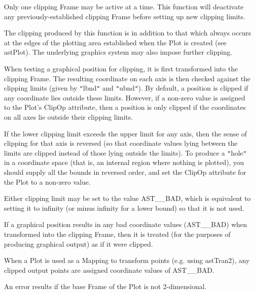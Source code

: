 \documentclass[twoside,11pt]{article}
\newcommand{\htmlref}[2]{#1}
\begin{document}
{{{         \sstitem
         Only one clipping Frame may be active at a time. This function
         will deactivate any previously-established clipping Frame before
         setting up new clipping limits.

         \sstitem
         The clipping produced by this function is in addition to that
         which always occurs at the edges of the plotting area
         established when the Plot is created (see \htmlref{astPlot}{astPlot}). The
         underlying graphics system may also impose further clipping.

         \sstitem
         When testing a graphical position for clipping, it is first
         transformed into the clipping Frame. The resulting coordinate on
         each axis is then checked against the clipping limits (given by
         {\tt{"}}lbnd{\tt{"}} and {\tt{"}}ubnd{\tt{"}}). By default, a position is clipped if any
         coordinate lies outside these limits. However, if a non-zero
         value is assigned to the Plot's \htmlref{ClipOp}{ClipOp} attribute, then a
         position is only clipped if the coordinates on all axes lie
         outside their clipping limits.

         \sstitem
         If the lower clipping limit exceeds the upper limit for any
         axis, then the sense of clipping for that axis is reversed (so
         that coordinate values lying between the limits are clipped
         instead of those lying outside the limits). To produce a {\tt{"}}hole{\tt{"}}
         in a coordinate space (that is, an internal region where nothing
         is plotted), you should supply all the bounds in reversed order,
         and set the ClipOp attribute for the Plot to a non-zero value.

         \sstitem
         Either clipping limit may be set to the value AST\_\_BAD, which
         is equivalent to setting it to infinity (or minus infinity for a
         lower bound) so that it is not used.

         \sstitem
         If a graphical position results in any bad coordinate values
         (AST\_\_BAD) when transformed into the clipping Frame, then it is
         treated (for the purposes of producing graphical output) as if
         it were clipped.

         \sstitem
         When a Plot is used as a \htmlref{Mapping}{Mapping} to transform points
         (e.g. using \htmlref{astTran2}{astTran2}), any clipped output points are assigned
         coordinate values of AST\_\_BAD.

         \sstitem
         An error results if the base Frame of the Plot is not
         2-dimensional.
      }
   }
}
\end{document}
